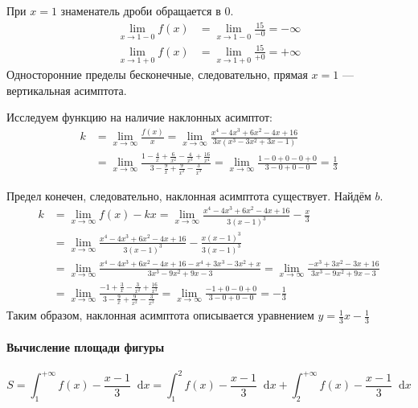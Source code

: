 \documentclass[a4paper,12pt]{article}
\newcommand*\diff{\mathop{}\!\mathrm{d}}
\begin{document}
При \(x = 1\) знаменатель дроби обращается в 0.
\begin{align*}
  \lim_{x \to 1 - 0} f(x) &= \lim_{x \to 1 - 0} \frac{15}{-0} = -\infty \\
  \lim_{x \to 1 + 0} f(x) &= \lim_{x \to 1 + 0} \frac{15}{+0} = +\infty
\end{align*}
Односторонние пределы бесконечные, следовательно,
прямая \(x = 1\) --- вертикальная асимптота.

Исследуем функцию на наличие наклонных асимптот:
\begin{equation*}
\begin{split}
  k &= \lim_{x \to \infty} \frac{f(x)}{x}
     = \lim_{x \to \infty}
        \frac{x^4 - 4 x^3 + 6 x^2 - 4 x + 16}
             {3 x (x^3 - 3 x^2 + 3 x - 1)} \\
    &= \lim_{x \to \infty}
        \frac{1 - \frac{4}{x} + \frac{6}{x^2} - \frac{4}{x^3} + \frac{16}{x^4}}
             {3 - \frac{9}{x} + \frac{9}{x^2} - \frac{3}{x^3}}
     = \lim_{x \to \infty} \frac{1 - 0 + 0 - 0 + 0}{3 - 0 + 0 - 0}
     = \frac{1}{3}
\end{split}
\end{equation*}

Предел конечен, следовательно, наклонная асимптота существует.
Найдём \(b\).
\begin{equation*}
\begin{split}
  k &= \lim_{x \to \infty} f(x) - k x
     = \lim_{x \to \infty}
     \frac{x^4 - 4 x^3 + 6 x^2 - 4 x + 16} {3 {(x - 1)}^3}
     - \frac{x}{3} \\
    &= \lim_{x \to \infty}
     \frac{x^4 - 4 x^3 + 6 x^2 - 4 x + 16} {3 {(x - 1)}^3}
     - \frac{x {(x - 1)}^3}{3 {(x - 1)}^3} \\
    &= \lim_{x \to \infty}
     \frac{x^4 - 4 x^3 + 6 x^2 - 4 x + 16 - x^4 + 3 x^3 - 3 x^2 + x}
          {3 x^3 - 9 x^2 + 9 x - 3}
     = \lim_{x \to \infty}
     \frac{-x^3 + 3 x^2 - 3 x + 16}{3 x^3 - 9 x^2 + 9 x - 3} \\
    &= \lim_{x \to \infty}
     \frac{-1 + \frac{3}{x} - \frac{3}{x^2} + \frac{16}{x^3}}
          {3 - \frac{9}{x} + \frac{9}{x^2} - \frac{3}{x^3}}
     = \lim_{x \to \infty}
     \frac{-1 + 0 - 0 + 0}{3 - 0 + 0 - 0}
     = -\frac{1}{3}
\end{split}
\end{equation*}
Таким образом, наклонная асимптота описывается уравнением
\(y = \frac{1}{3} x - \frac{1}{3}\)

\paragraph{Вычисление площади фигуры}
\begin{equation} \label{eq:3-int-s}
  S
  = \int_{1}^{+\infty} f(x) - \frac{x - 1}{3} \diff x
  = \int_{1}^{2} f(x) - \frac{x - 1}{3} \diff x
  + \int_{2}^{+\infty} f(x) - \frac{x - 1}{3} \diff x
\end{equation}
\end{document}
